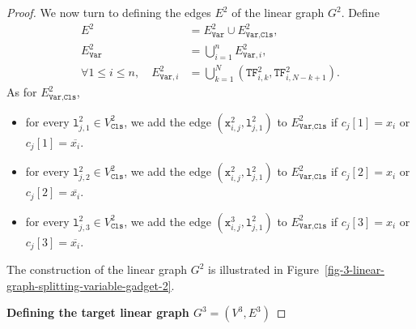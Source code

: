 \begin{proof}
    We now turn to defining the edges $E^{2}$ of the linear graph $G^{2}$.
    Define
    \begin{align*}
      E^{2} &= E^{2}_{\texttt{Var}} \cup E^{2}_{\texttt{Var},\texttt{Cls}},
      \\
      E^{2}_{\texttt{Var}} &= \bigcup_{i=1}^{n} E^{2}_{\texttt{Var}, i},
      \\
      \forall 1\leq i \leq n,\quad
      E^{2}_{\texttt{Var}, i} &= \bigcup_{k=1}^{N} (\texttt{TF}^{2}_{i,k}, \texttt{TF}^{2}_{i,N-k+1})\text{.}
    \end{align*}
    As for $E^{2}_{\texttt{Var},\texttt{Cls}}$,
    \begin{itemize}
      \item
      for every $\texttt{l}^{2}_{j, 1} \in V^{2}_{\texttt{Cls}}$,
      we add
      the edge $(\texttt{x}^{2}_{i,j}, \texttt{l}^{2}_{j, 1})$
      to $E^{2}_{\texttt{Var},\texttt{Cls}}$
      if $c_{j}[1] = x_{i}$ or $c_{j}[1] = \overline{x_{i}}$.
      \item
      for every $\texttt{l}^{2}_{j, 2} \in V^{2}_{\texttt{Cls}}$,
      we add
      the edge $(\texttt{x}^{2}_{i,j}, \texttt{l}^{2}_{j, 1})$
      to $E^{2}_{\texttt{Var},\texttt{Cls}}$
      if $c_{j}[2] = x_{i}$ or $c_{j}[2] = \overline{x_{i}}$.
      \item
      for every $\texttt{l}^{2}_{j, 3} \in V^{2}_{\texttt{Cls}}$,
      we add
      the edge $(\texttt{x}^{3}_{i,j}, \texttt{l}^{2}_{j, 1})$
      to $E^{2}_{\texttt{Var},\texttt{Cls}}$
      if $c_{j}[3] = x_{i}$ or $c_{j}[3] = \overline{x_{i}}$.
    \end{itemize}

  The construction of the linear graph $G^{2}$ is illustrated
  in Figure~\ref{fig-3-linear-graph-splitting-variable-gadget-2}.

  

  \medskip
  \textbf{Defining the target linear graph $G^{3} = (V^{3}, E^{3})$}
  \medskip


\end{proof}
